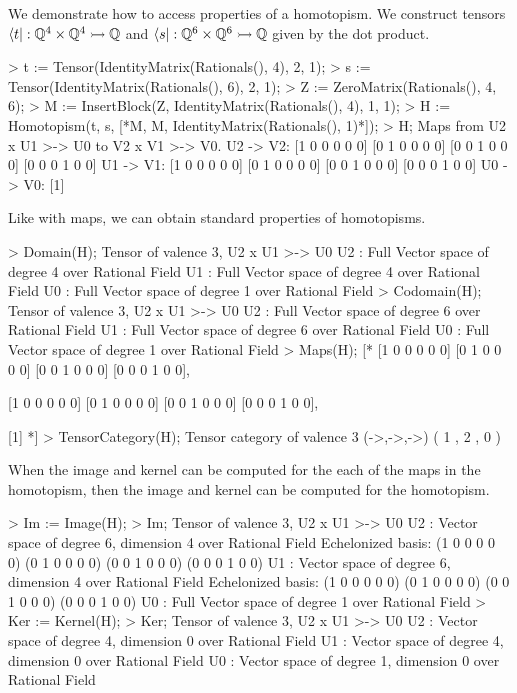\begin{example}[HomotopismProps]

We demonstrate how to access properties of a homotopism. We construct tensors
$\langle t|:\mathbb{Q}^4\times\mathbb{Q}^4\rightarrowtail \mathbb{Q}$ and
$\langle s|:\mathbb{Q}^6\times\mathbb{Q}^6\rightarrowtail\mathbb{Q}$ given by the dot
product.
\begin{code}
> t := Tensor(IdentityMatrix(Rationals(), 4), 2, 1);
> s := Tensor(IdentityMatrix(Rationals(), 6), 2, 1);
> Z := ZeroMatrix(Rationals(), 4, 6);
> M := InsertBlock(Z, IdentityMatrix(Rationals(), 4), 1, 1);
> H := Homotopism(t, s, [*M, M, IdentityMatrix(Rationals(), 1)*]);
> H;
Maps from U2 x U1 >-> U0 to V2 x V1 >-> V0.
U2 -> V2: 
[1 0 0 0 0 0]
[0 1 0 0 0 0]
[0 0 1 0 0 0]
[0 0 0 1 0 0]
U1 -> V1: 
[1 0 0 0 0 0]
[0 1 0 0 0 0]
[0 0 1 0 0 0]
[0 0 0 1 0 0]
U0 -> V0: 
[1]
\end{code}

Like with maps, we can obtain standard properties of homotopisms.
\begin{code}
> Domain(H);
Tensor of valence 3, U2 x U1 >-> U0
U2 : Full Vector space of degree 4 over Rational Field
U1 : Full Vector space of degree 4 over Rational Field
U0 : Full Vector space of degree 1 over Rational Field
> Codomain(H);
Tensor of valence 3, U2 x U1 >-> U0
U2 : Full Vector space of degree 6 over Rational Field
U1 : Full Vector space of degree 6 over Rational Field
U0 : Full Vector space of degree 1 over Rational Field
> Maps(H);
[*
    [1 0 0 0 0 0]
    [0 1 0 0 0 0]
    [0 0 1 0 0 0]
    [0 0 0 1 0 0],

    [1 0 0 0 0 0]
    [0 1 0 0 0 0]
    [0 0 1 0 0 0]
    [0 0 0 1 0 0],

    [1]
*]
> TensorCategory(H);
Tensor category of valence 3 (->,->,->) ({ 1 },{ 2 },{ 0 })
\end{code}

When the image and kernel can be computed for the each of the maps in the
homotopism, then the image and kernel can be computed for the homotopism.
\begin{code}
> Im := Image(H);
> Im;
Tensor of valence 3, U2 x U1 >-> U0
U2 : Vector space of degree 6, dimension 4 over Rational Field
Echelonized basis:
(1 0 0 0 0 0)
(0 1 0 0 0 0)
(0 0 1 0 0 0)
(0 0 0 1 0 0)
U1 : Vector space of degree 6, dimension 4 over Rational Field
Echelonized basis:
(1 0 0 0 0 0)
(0 1 0 0 0 0)
(0 0 1 0 0 0)
(0 0 0 1 0 0)
U0 : Full Vector space of degree 1 over Rational Field
> Ker := Kernel(H);
> Ker;
Tensor of valence 3, U2 x U1 >-> U0
U2 : Vector space of degree 4, dimension 0 over Rational Field
U1 : Vector space of degree 4, dimension 0 over Rational Field
U0 : Vector space of degree 1, dimension 0 over Rational Field
\end{code}
\end{example}


